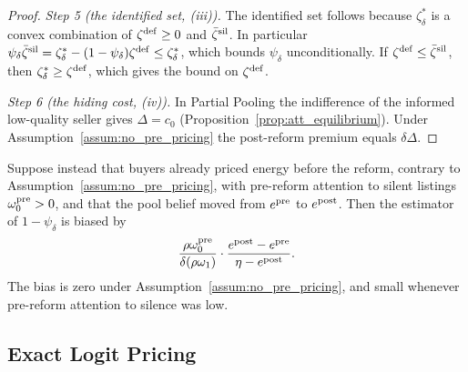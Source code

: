 \begin{proof}
\emph{Step 5 (the identified set, (iii)).} The identified set follows because $\zeta^*_\delta$ is a convex combination of $\zeta^{\rm def}\ge0$ and $\bar \zeta^{\rm sil}$. In particular $\psi_\delta\bar \zeta^{\rm sil}=\zeta^*_\delta-(1-\psi_\delta)\zeta^{\rm def}\le \zeta^*_\delta$, which bounds $\psi_\delta$ unconditionally. If $\zeta^{\rm def}\le\bar \zeta^{\rm sil}$, then $\zeta^*_\delta\ge \zeta^{\rm def}$, which gives the bound on $\zeta^{\rm def}$.

\emph{Step 6 (the hiding cost, (iv)).} In Partial Pooling the indifference of the informed low-quality seller gives $\Delta=c_0$ (Proposition~\ref{prop:att_equilibrium}). Under Assumption~\ref{assum:no_pre_pricing} the post-reform premium equals $\delta\Delta$.
\end{proof}

Suppose instead that buyers already priced energy before the reform, contrary to Assumption~\ref{assum:no_pre_pricing}, with pre-reform attention to silent listings $\omega_0^{\rm pre}>0$, and that the pool belief moved from $e^{\rm pre}$ to $e^{\rm post}$. Then the estimator of $1-\psi_\delta$ is biased by
\begin{equation*}
    \frac{\rho\omega_0^{\rm pre}}{\delta(\rho\omega_1)}\cdot\frac{e^{\rm post}-e^{\rm pre}}{\eta-e^{\rm post}}.
\end{equation*}
The bias is zero under Assumption~\ref{assum:no_pre_pricing}, and small whenever pre-reform attention to silence was low.


\subsection*{Exact Logit Pricing}
\label{app:att_exact}

